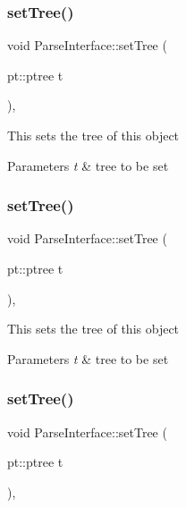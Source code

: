 \subsubsection{\texorpdfstring{set\+Tree()}{setTree()}\hspace{0.1cm}{\footnotesize\ttfamily [1/3]}}
{\footnotesize\ttfamily void Parse\+Interface\+::set\+Tree (\begin{DoxyParamCaption}\item[{pt\+::ptree}]{t }\end{DoxyParamCaption})\hspace{0.3cm}{\ttfamily [inline]}, {\ttfamily [protected]}}

This sets the tree of this object 
\begin{DoxyParams}{Parameters}
{\em t} & tree to be set \\
\hline
\end{DoxyParams}
\mbox{\label{classParseInterface_af983d932c4a708ffeba59fe71b46c2dc}} 
\subsubsection{\texorpdfstring{set\+Tree()}{setTree()}\hspace{0.1cm}{\footnotesize\ttfamily [2/3]}}
{\footnotesize\ttfamily void Parse\+Interface\+::set\+Tree (\begin{DoxyParamCaption}\item[{pt\+::ptree}]{t }\end{DoxyParamCaption})\hspace{0.3cm}{\ttfamily [inline]}, {\ttfamily [protected]}}

This sets the tree of this object 
\begin{DoxyParams}{Parameters}
{\em t} & tree to be set \\
\hline
\end{DoxyParams}
\mbox{\label{classParseInterface_af983d932c4a708ffeba59fe71b46c2dc}} 
\subsubsection{\texorpdfstring{set\+Tree()}{setTree()}\hspace{0.1cm}{\footnotesize\ttfamily [3/3]}}
{\footnotesize\ttfamily void Parse\+Interface\+::set\+Tree (\begin{DoxyParamCaption}\item[{pt\+::ptree}]{t }\end{DoxyParamCaption})\hspace{0.3cm}{\ttfamily [inline]}, {\ttfamily [protected]}}

